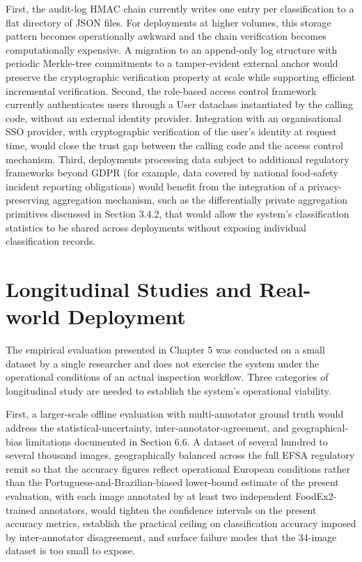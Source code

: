 First, the audit-log HMAC chain currently writes one entry per classification to a flat directory of JSON files. For deployments at higher volumes, this storage pattern becomes operationally awkward and the chain verification becomes computationally expensive. A migration to an append-only log structure with periodic Merkle-tree commitments to a tamper-evident external anchor would preserve the cryptographic verification property at scale while supporting efficient incremental verification. Second, the role-based access control framework currently authenticates users through a User dataclass instantiated by the calling code, without an external identity provider. Integration with an organisational SSO provider, with cryptographic verification of the user's identity at request time, would close the trust gap between the calling code and the access control mechanism. Third, deployments processing data subject to additional regulatory frameworks beyond GDPR (for example, data covered by national food-safety incident reporting obligations) would benefit from the integration of a privacy-preserving aggregation mechanism, such as the differentially private aggregation primitives discussed in Section 3.4.2, that would allow the system's classification statistics to be shared across deployments without exposing individual classification records.

\hypertarget{longitudinal-studies-and-real-world-deployment}{%
\section{Longitudinal Studies and Real-world Deployment}\label{longitudinal-studies-and-real-world-deployment}}

The empirical evaluation presented in Chapter 5 was conducted on a small dataset by a single researcher and does not exercise the system under the operational conditions of an actual inspection workflow. Three categories of longitudinal study are needed to establish the system's operational viability.

First, a larger-scale offline evaluation with multi-annotator ground truth would address the statistical-uncertainty, inter-annotator-agreement, and geographical-bias limitations documented in Section 6.6. A dataset of several hundred to several thousand images, geographically balanced across the full EFSA regulatory remit so that the accuracy figures reflect operational European conditions rather than the Portuguese-and-Brazilian-biased lower-bound estimate of the present evaluation, with each image annotated by at least two independent FoodEx2-trained annotators, would tighten the confidence intervals on the present accuracy metrics, establish the practical ceiling on classification accuracy imposed by inter-annotator disagreement, and surface failure modes that the 34-image dataset is too small to expose.

